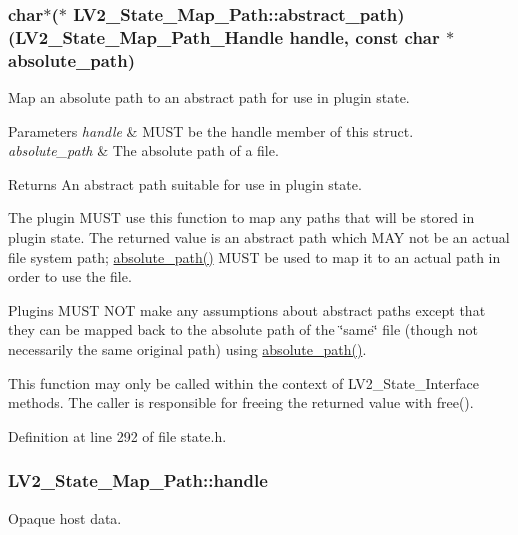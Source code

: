 \subsubsection[{\texorpdfstring{abstract\+\_\+path}{abstract_path}}]{\setlength{\rightskip}{0pt plus 5cm}char$\ast$($\ast$ L\+V2\+\_\+\+State\+\_\+\+Map\+\_\+\+Path\+::abstract\+\_\+path) ({\bf L\+V2\+\_\+\+State\+\_\+\+Map\+\_\+\+Path\+\_\+\+Handle} {\bf handle}, {\bf const} char $\ast${\bf absolute\+\_\+path})}\hypertarget{struct_l_v2___state___map___path_a850e9ac4229d1db077b4db6484cf4dd7}{}\label{struct_l_v2___state___map___path_a850e9ac4229d1db077b4db6484cf4dd7}
Map an absolute path to an abstract path for use in plugin state. 
\begin{DoxyParams}{Parameters}
{\em handle} & M\+U\+ST be the {\ttfamily handle} member of this struct. \\
\hline
{\em absolute\+\_\+path} & The absolute path of a file. \\
\hline
\end{DoxyParams}
\begin{DoxyReturn}{Returns}
An abstract path suitable for use in plugin state.
\end{DoxyReturn}
The plugin M\+U\+ST use this function to map any paths that will be stored in plugin state. The returned value is an abstract path which M\+AY not be an actual file system path; \hyperlink{struct_l_v2___state___map___path_a1b84232ea39fbaf8444ca437a0480b8f}{absolute\+\_\+path()} M\+U\+ST be used to map it to an actual path in order to use the file.

Plugins M\+U\+ST N\+OT make any assumptions about abstract paths except that they can be mapped back to the absolute path of the \char`\"{}same\char`\"{} file (though not necessarily the same original path) using \hyperlink{struct_l_v2___state___map___path_a1b84232ea39fbaf8444ca437a0480b8f}{absolute\+\_\+path()}.

This function may only be called within the context of L\+V2\+\_\+\+State\+\_\+\+Interface methods. The caller is responsible for freeing the returned value with free(). 

Definition at line 292 of file state.\+h.

\subsubsection[{\texorpdfstring{handle}{handle}}]{ L\+V2\+\_\+\+State\+\_\+\+Map\+\_\+\+Path\+::handle}\hypertarget{struct_l_v2___state___map___path_a1f69f5f23da52535ba9ea887504a15b7}{}\label{struct_l_v2___state___map___path_a1f69f5f23da52535ba9ea887504a15b7}
Opaque host data. 

